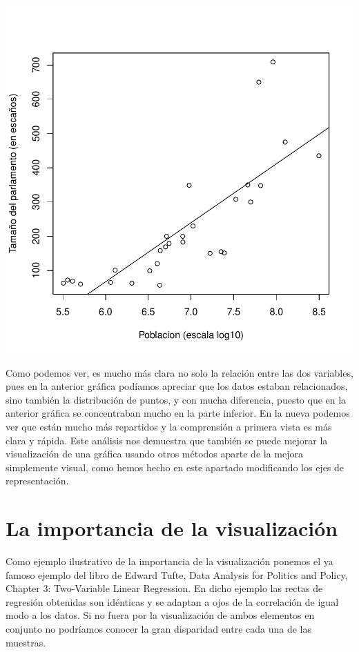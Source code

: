 \documentclass [a4paper] {article}
\begin{document}
\begin{center}
\includegraphics{entrega-plot_democracia_log}
\end{center}

Como podemos ver, es mucho más clara no solo la relación entre las dos variables, pues en la anterior gráfica 
podíamos apreciar que los datos estaban relacionados, sino también la distribución de puntos,  y con mucha diferencia,
puesto que en la anterior gráfica se concentraban mucho en la parte inferior. En la nueva podemos ver que están mucho más repartidos y la comprensión 
a primera vista es más clara y rápida. Este análisis nos demuestra que también se puede mejorar la visualización de 
una gráfica usando otros métodos aparte de la mejora simplemente visual, como hemos hecho en este apartado modificando los ejes de representación.

\section{La importancia de la visualización}
Como ejemplo ilustrativo de la importancia de la visualización ponemos el ya famoso ejemplo del libro de Edward Tufte, Data Analysis for Politics and Policy, Chapter 3: Two-Variable Linear Regression.
En dicho ejemplo las rectas de regresión obtenidas son idénticas y se adaptan a ojos de la correlación de igual modo a los datos.
Si no fuera por la visualización de ambos elementos en conjunto no podríamos conocer la gran disparidad entre cada una de las muestras.
\end{document}
